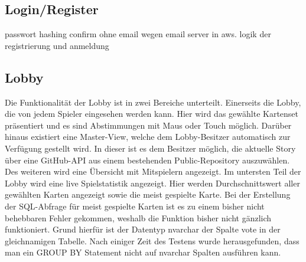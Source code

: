 \subsection{Login/Register}\label{subsec:login/register}
passwort hashing
confirm ohne email wegen email server in aws.
logik der registrierung und anmeldung

\subsection{Lobby}\label{subsec:lobby}
Die Funktionalität der Lobby ist in zwei Bereiche unterteilt. Einerseits die Lobby, die von jedem Spieler eingesehen werden kann. Hier wird das gewählte Kartenset präsentiert und es sind Abstimmungen mit Maus oder Touch möglich. Darüber hinaus existiert eine Master-View, welche dem Lobby-Besitzer automatisch zur Verfügung gestellt wird. In dieser ist es dem Besitzer möglich, die aktuelle Story über eine GitHub-API aus einem bestehenden Public-Repository auszuwählen. Des weiteren wird eine Übersicht mit Mitspielern angezeigt. Im untersten Teil der Lobby wird eine live Spielstatistik angezeigt. Hier werden Durchschnittswert aller gewählten Karten angezeigt sowie die meist gespielte Karte. Bei der Erstellung der SQL-Abfrage für meist gespielte Karten ist es zu einem bisher nicht behebbaren Fehler gekommen, weshalb die Funktion bisher nicht gänzlich funktioniert. Grund hierfür ist der Datentyp nvarchar der Spalte vote in der gleichnamigen Tabelle. Nach einiger Zeit des Testens wurde herausgefunden, dass man ein GROUP BY Statement nicht auf nvarchar Spalten ausführen kann. 